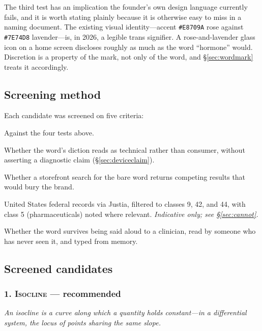 \documentclass[11pt,a4paper]{article}
\newcommand{\code}[1]{\texttt{\small #1}}
\newcommand{\name}[1]{\textsc{#1}}
\begin{document}
The third test has an implication the founder's own design language
currently fails, and it is worth stating plainly because it is
otherwise easy to miss in a naming document. The existing visual
identity---accent \code{\#E8709A} rose against \code{\#7E74D8}
lavender---is, in 2026, a legible trans signifier. A rose-and-lavender
glass icon on a home screen discloses roughly as much as the word
``hormone'' would. Discretion is a property of the mark, not only of
the word, and \S\ref{sec:wordmark} treats it accordingly.

\subsection{Screening method}

Each candidate was screened on five criteria:

\begin{description}[leftmargin=1.4em,style=nextline,itemsep=0.25em]
\item[Discretion] Against the four tests above.
\item[Clinical register] Whether the word's diction reads as technical
      rather than consumer, without asserting a diagnostic claim
      (\S\ref{sec:deviceclaim}).
\item[App Store collision] Whether a storefront search for the bare
      word returns competing results that would bury the brand.
\item[Trademark screen] United States federal records via Justia,
      filtered to classes 9, 42, and 44, with class 5
      (pharmaceuticals) noted where relevant. \emph{Indicative only;
      see \S\ref{sec:cannot}.}
\item[Sayability] Whether the word survives being said aloud to a
      clinician, read by someone who has never seen it, and typed from
      memory.
\end{description}

\subsection{Screened candidates}
\label{sec:candidates}

\subsubsection*{1. \name{Isocline} --- recommended}

\emph{An isocline is a curve along which a quantity holds constant---in
a differential system, the locus of points sharing the same slope.}
\end{document}

